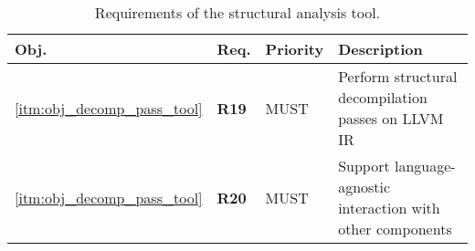 \begin{table}[htbp]
	\begin{center}
		\begin{tabular}{|l|l|l|l|}
			\hline
			Obj. & Req. & Priority & Description \\
			\hline
			\ref{itm:obj_decomp_pass_tool} & \textbf{R19} & MUST & Perform structural decompilation passes on LLVM IR \\
			\ref{itm:obj_decomp_pass_tool} & \textbf{R20} & MUST & Support language-agnostic interaction with other components \\
			\hline
		\end{tabular}
	\end{center}
	\caption{Requirements of the structural analysis tool.}
\end{table}
